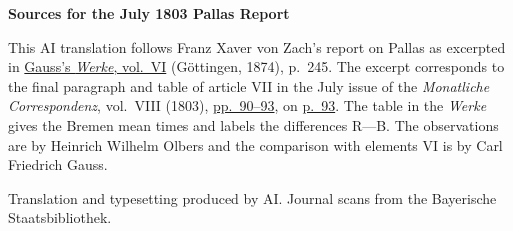 \clearpage\thispagestyle{empty}
\begin{center}\textbf{Sources for the July 1803 Pallas Report}\end{center}
\noindent This AI translation follows Franz Xaver von Zach’s report on Pallas as excerpted in \href{https://gdz.sub.uni-goettingen.de/id/PPN236007467}{Gauss’s \textit{Werke}, vol.~VI} (Göttingen, 1874), p.~245. The excerpt corresponds to the final paragraph and table of article VII in the July issue of the \textit{Monatliche Correspondenz}, vol.~VIII (1803), \href{https://api.digitale-sammlungen.de/iiif/image/v2/bsb10538600_00096/full/1450,/0/default.jpg}{pp.~90--93}, on \href{https://api.digitale-sammlungen.de/iiif/image/v2/bsb10538600_00099/full/1450,/0/default.jpg}{p.~93}. The table in the \textit{Werke} gives the Bremen mean times and labels the differences R—B. The observations are by Heinrich Wilhelm Olbers and the comparison with elements VI is by Carl Friedrich Gauss.
\par\smallskip\noindent Translation and typesetting produced by AI. Journal scans from the Bayerische Staatsbibliothek.
\clearpage
